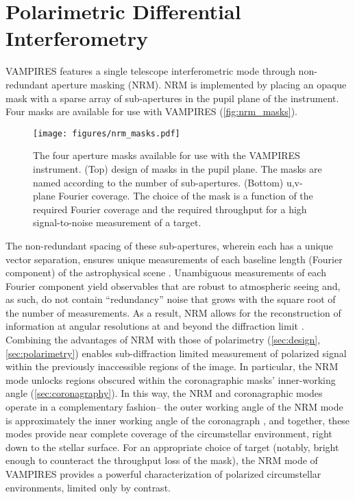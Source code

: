 \section{Polarimetric Differential Interferometry}\label{sec:interferometry}


 
 

VAMPIRES features a single telescope interferometric mode through non-redundant aperture masking (NRM). NRM is implemented by placing an opaque mask with a sparse array of sub-apertures in the pupil plane of the instrument. Four masks are available for use with VAMPIRES (\autoref{fig:nrm_masks}).


\begin{figure*}[t]
    \centering
    \texttt{[image: figures/nrm\_masks.pdf]}
    \caption{The four aperture masks available for use with the VAMPIRES instrument. (Top) design of masks in the pupil plane. The masks are named according to the number of sub-apertures. (Bottom) u,v-plane Fourier coverage. The choice of the mask is a function of the required Fourier coverage and the required throughput for a high signal-to-noise measurement of a target. \label{fig:nrm_masks}}
\end{figure*}

The non-redundant spacing of these sub-apertures, wherein each has a unique vector separation, ensures unique measurements of each baseline length (Fourier component) of the astrophysical scene \citep{tuthill_aperture_2000}. Unambiguous measurements of each Fourier component yield observables that are robust to atmospheric seeing and, as such, do not contain ``redundancy'' noise that grows with the square root of the number of measurements. As a result, NRM allows for the reconstruction of information at angular resolutions at and beyond the diffraction limit \citep{labeyrie_introduction_2014}. Combining the advantages of NRM with those of polarimetry (\autoref{sec:design}, \autoref{sec:polarimetry}) enables sub-diffraction limited measurement of polarized signal within the previously inaccessible regions of the image. In particular, the NRM mode unlocks regions obscured within the coronagraphic masks' inner-working angle (\autoref{sec:coronagraphy}). In this way, the NRM and coronagraphic modes operate in a complementary fashion-- the outer working angle of the NRM mode is approximately the inner working angle of the coronagraph \citep{norris_vampires_2015}, and together, these modes provide near complete coverage of the circumstellar environment, right down to the stellar surface. For an appropriate choice of target (notably, bright enough to counteract the throughput loss of the mask), the NRM mode of VAMPIRES provides a powerful characterization of polarized circumstellar environments, limited only by contrast. 


